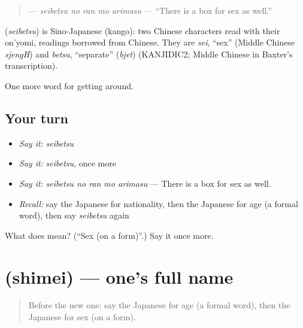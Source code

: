 \begin{quote}
\textbf{  } — \emph{seibetsu no ran mo arimasu} — \textquotedblleft{}There is a box for sex as well.\textquotedblright{}
\end{quote}

\begin{cousinweb}
\textbf{} (\emph{seibetsu}) is Sino-Japanese (kango): two Chinese characters read with their on'yomi, readings borrowed from Chinese. They are \emph{sei}, \textquotedblleft{}sex\textquotedblright{} (Middle Chinese \emph{sjengH}) and \emph{betsu}, \textquotedblleft{}separate\textquotedblright{} (\emph{bjet}) (KANJIDIC2; Middle Chinese in Baxter's transcription).
\end{cousinweb}

\begin{grammarlens}[title={What you've built}]
One more word for getting around.
\end{grammarlens}

\subsection*{Your turn}
\begin{itemize}
\raggedright
  \item \emph{Say it:} \emph{seibetsu}
  \item \emph{Say it:} \emph{seibetsu}, once more
  \item \emph{Say it:} \emph{seibetsu no ran mo arimasu} — There is a box for sex as well.
  \item \emph{Recall:} say the Japanese for nationality, then the Japanese for age (a formal word), then say \emph{seibetsu} again
\end{itemize}

\begin{tcolorbox}[breakable,colback=teal!4,colframe=teal!35!black,title={Before you move on}]
What does  mean? (\textquotedblleft{}Sex (on a form)\textquotedblright{}.) Say it once more.
\end{tcolorbox}
\section[\texorpdfstring{\ja{しめい} (shimei)}{しめい (shimei)}]{ (shimei) — one's full name}

\label{lesson:JA-C419-shimei}



\begin{quote}
Before the new one: say the Japanese for age (a formal word), then the Japanese for sex (on a form).
\end{quote}

